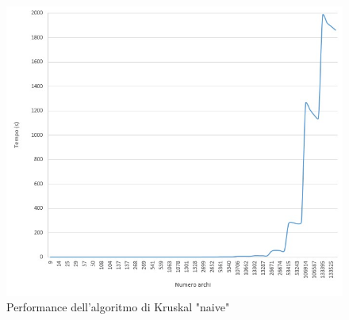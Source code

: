 \begin{figure}[H]
	\centering\includegraphics[width=15cm]{Img/kruskal_naive.jpg}
	\caption{Performance dell'algoritmo di Kruskal "naive"}
\end{figure}


\pagebreak